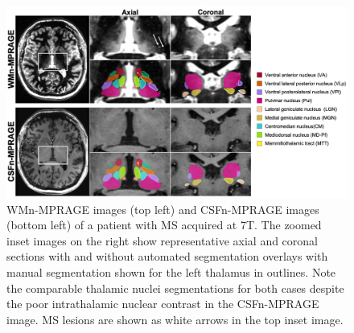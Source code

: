 \documentclass[3p,,final,12pt]{elsarticle}
\begin{document}
\bgroup
{}
\begin{figure}[!htbp]
\centering \includegraphics{Thalamus/images/slide5.jpeg}
\makeatother 
\caption{WMn-MPRAGE images (top left) and CSFn-MPRAGE images (bottom left) of a patient with MS acquired at 7T. The zoomed inset images on the right show representative axial and coronal sections with and without automated segmentation overlays with manual segmentation shown for the left thalamus in outlines. Note the comparable thalamic nuclei segmentations for both cases despite the poor intrathalamic nuclear contrast in the CSFn-MPRAGE image. MS lesions are shown as white arrows in the top inset image. }
\label{f-7433626f60be}
\end{figure}
\egroup
\end{document}
